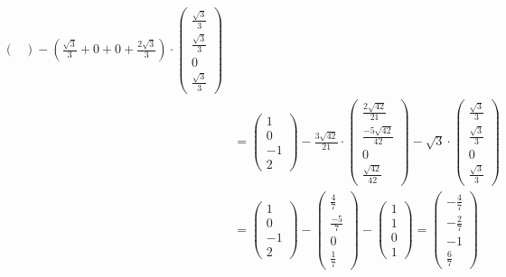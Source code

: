 \documentclass{article} %
\begin{document}
\begin{align*}
\begin{pmatrix}
\end{pmatrix} - (\frac{\sqrt{3}}{3} + 0 + 0 + \frac{2\sqrt{3}}{3}) \cdot  \begin{pmatrix} 
\frac{\sqrt{3}}{3}\\\frac{\sqrt{3}}{3}\\0\\\frac{\sqrt{3}}{3}
\end{pmatrix}  \\
&= \begin{pmatrix} 
1\\0\\-1\\2
\end{pmatrix} - \frac{3\sqrt{42}}{21} \cdot \begin{pmatrix} 
\frac{2\sqrt{42}}{21}\\\frac{-5\sqrt{42}}{42}\\0\\\frac{\sqrt{42}}{42}
\end{pmatrix} -  \sqrt{3} \cdot  \begin{pmatrix} 
\frac{\sqrt{3}}{3}\\\frac{\sqrt{3}}{3}\\0\\\frac{\sqrt{3}}{3}
\end{pmatrix}  \\
% 
&= \begin{pmatrix} 
1\\0\\-1\\2
\end{pmatrix} - \begin{pmatrix} 
\frac{4}{7}\\\frac{-5}{7}\\0\\\frac{1}{7}
\end{pmatrix} -  \begin{pmatrix} 
1 \\1\\0\\1
\end{pmatrix}   = \begin{pmatrix}
-\frac{4}{7} \\ - \frac{2}{7} \\ -1 \\ \frac{6}{7}
\end{pmatrix}
\end{align*}
\end{document}
